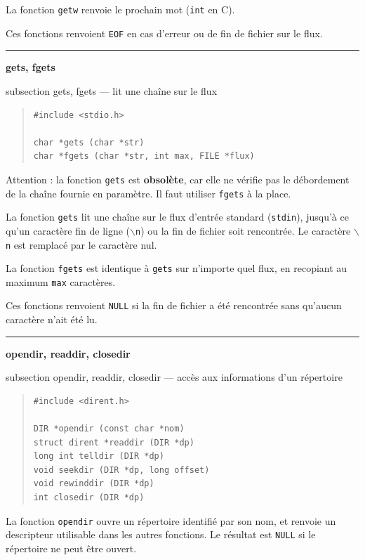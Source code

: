 \documentclass [twoside] {report}
\newcommand {\primitive} [1]
    {
	\phantomsection
	{\large \textbf {#1}}
	\addcontentsline {toc} {subsection} {#1}
    }
\newcommand {\separation}
    {
	\vspace {5mm}
	\nopagebreak
	\hrule
    }
\begin{document}
La fonction \texttt {getw} renvoie le prochain mot (\texttt {int} en C).

Ces fonctions renvoient \texttt {EOF} en cas d'erreur ou de fin de
fichier sur le flux.



\separation
\primitive {gets, fgets} --- lit une chaîne sur le flux

\begin {quote}
\begin {verbatim}
#include <stdio.h>

char *gets (char *str)
char *fgets (char *str, int max, FILE *flux)
\end{verbatim}
\end {quote}

Attention : la fonction \texttt {gets} est \textbf {obsolète}, car elle ne
vérifie pas le débordement de la chaîne fournie en paramètre. Il
faut utiliser \texttt {fgets} à la place.

La fonction \texttt {gets} lit une chaîne sur le flux d'entrée
standard (\texttt {stdin}), jusqu'à ce qu'un caractère fin de ligne
(\texttt {$\backslash$n}) ou la fin de fichier soit rencontrée. Le caractère
\texttt {$\backslash$n} est remplacé par le caractère nul.

La fonction \texttt {fgets} est identique à \texttt {gets} sur n'importe
quel flux, en recopiant au maximum \texttt {max} caractères.

Ces fonctions renvoient \texttt {NULL} si la fin de fichier a été
rencontrée sans qu'aucun caractère n'ait été lu.


\separation
\primitive {opendir, readdir, closedir} --- accès aux informations d'un répertoire
    \label {opendir}

\begin {quote}
\begin {verbatim}
#include <dirent.h>

DIR *opendir (const char *nom)
struct dirent *readdir (DIR *dp)
long int telldir (DIR *dp)
void seekdir (DIR *dp, long offset)
void rewinddir (DIR *dp)
int closedir (DIR *dp)
\end{verbatim}
\end {quote}

La fonction \texttt {opendir} ouvre un répertoire identifié par son nom, et
renvoie un descripteur utilisable dans les autres fonctions. Le résultat
est \texttt {NULL} si le répertoire ne peut être ouvert.
\end{document}

